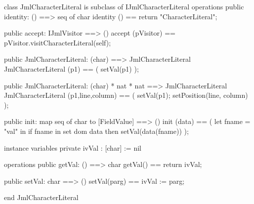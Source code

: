 \begin{vdm_al}
class JmlCharacterLiteral is subclass of IJmlCharacterLiteral
operations
  public identity: () ==> seq of char
  identity () == return "CharacterLiteral";

  public accept: IJmlVisitor ==> ()
  accept (pVisitor) == pVisitor.visitCharacterLiteral(self);

  public JmlCharacterLiteral:
    (char) ==> JmlCharacterLiteral
  JmlCharacterLiteral (p1) == 
    ( setVal(p1) );

  public JmlCharacterLiteral:
    (char) *
    nat *
    nat ==> JmlCharacterLiteral
  JmlCharacterLiteral (p1,line,column) == 
    ( setVal(p1);
      setPosition(line, column) );

  public init: map seq of char to [FieldValue] ==> ()
  init (data) ==
    ( let fname = "val" in
        if fname in set dom data
        then setVal(data(fname)) );

instance variables
  private ivVal : [char] := nil

operations
  public getVal: () ==> char
  getVal() == return ivVal;

  public setVal: char ==> ()
  setVal(parg) == ivVal := parg;

end JmlCharacterLiteral
\end{vdm_al}

